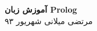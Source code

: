 \begin{titlepage}
\begin{center}
\vspace*{2cm}
\huge
\textbf{آموزش زبان Prolog} \\
\vspace{1.5cm}
\textsc{مرتضی میلانی}
\vfill
\small
شهریور ۹۳
\end{center}
\end{titlepage}
\tableofcontents{}